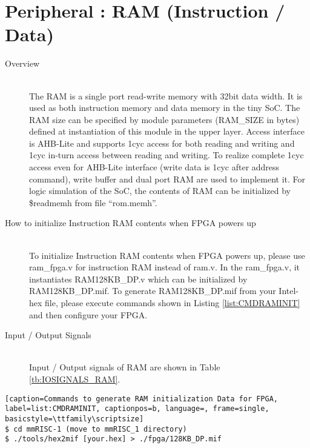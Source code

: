 \section{Peripheral : RAM (Instruction / Data)}

\begin{description}

    \item[Overview]\mbox{}\\
        The RAM is a single port read-write memory with 32bit data width. It is used as both instruction memory and data memory in the tiny SoC. The RAM size can be specified by module parameters (RAM\_SIZE in bytes) defined at instantiation of this module in the upper layer. Access interface is AHB-Lite and supports 1cyc access for both reading and writing and 1cyc in-turn access between reading and writing. To realize complete 1cyc access even for AHB-Lite interface (write data is 1cyc after address command), write buffer and dual port RAM are used to implement it. For logic simulation of the SoC, the contents of RAM can be initialized by \$readmemh from file “rom.memh”.
        
    \item[How to initialize Instruction RAM contents when FPGA powers up]\mbox{}\\
        To initialize Instruction RAM contents when FPGA powers up, please use ram\_fpga.v for instruction RAM instead of ram.v. In the ram\_fpga.v, it instantiates RAM128KB\_DP.v which can be initialized by RAM128KB\_DP.mif. To generate RAM128KB\_DP.mif from your Intel-hex file, please execute commands shown in Listing \ref{list:CMDRAMINIT} and then configure your FPGA.
        
    \item[Input / Output Signals]\mbox{}\\
        Input / Output signals of RAM are shown in Table \ref{tb:IOSIGNALS_RAM}.
 
\end{description}

    \begin{lstlisting}[caption=Commands to generate RAM initialization Data for FPGA, label=list:CMDRAMINIT, captionpos=b, language=, frame=single, basicstyle=\ttfamily\scriptsize]
$ cd mmRISC-1 (move to mmRISC_1 directory)
$ ./tools/hex2mif [your.hex] > ./fpga/128KB_DP.mif
    \end{lstlisting}

